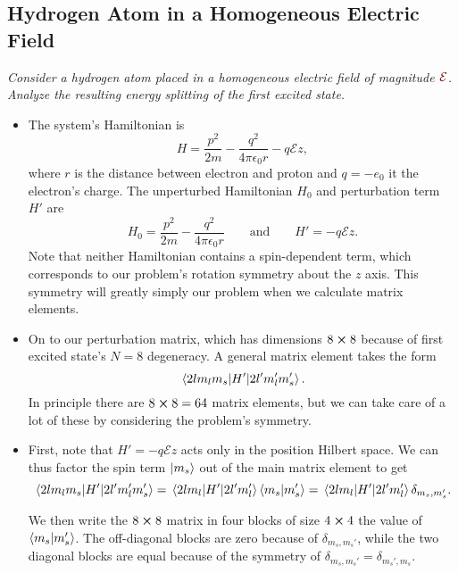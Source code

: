 \documentclass[11pt, a4paper]{article}
\newcommand{\dmath}[1]{\textcolor{Maroon}{#1}}  %
\newcommand{\eqtext}[1]{\qquad \text{#1} \qquad}
\newcommand{\Ham}{Hamiltonian\xspace}
\newcommand{\E}{\mathcal{E}}  %
\begin{document}
\subsection{Hydrogen Atom in a Homogeneous Electric Field}
\textit{Consider a hydrogen atom placed in a homogeneous electric field of magnitude $ \dmath{\E} $. Analyze the resulting energy splitting of the first excited state.}
\begin{itemize}
	\item The system's \Ham is 
	\begin{equation*}
		H = \frac{p^{2}}{2m} - \frac{q^{2}}{4\pi \epsilon_{0} r} - q \E z,
	\end{equation*}
	where $ r $ is the distance between electron and proton and $ q = -e_{0} $ it the electron's charge. The unperturbed Hamiltonian $ H_{0} $ and perturbation term $ H' $ are
	\begin{equation*}
		H_{0} = \frac{p^{2}}{2m} - \frac{q^{2}}{4\pi \epsilon_{0} r} \eqtext{and} H' = - q \E z.
	\end{equation*}
	Note that neither \Ham contains a spin-dependent term, which corresponds to our problem's rotation symmetry about the $ z $ axis. This symmetry will greatly simply our problem when we calculate matrix elements. 

	\item On to our perturbation matrix, which has dimensions $ 8 \cross 8 $ because of first excited state's $ N = 8 $ degeneracy. A general matrix element takes the form
	\begin{equation*}
		\mel{2lm_{l}m_{s}}{H'}{2l'm_{l}'m_{s}'}.
	\end{equation*}
	In principle there are $ 8 \cross 8 = 64 $ matrix elements, but we can take care of a lot of these by considering the problem's symmetry. 
	
	\item First, note that $ H' = - q \E z $ acts only in the position Hilbert space. We can thus factor the spin term $ \ket{m_{s}} $ out of the main matrix element to get
	\begin{equation*}
		\mel{2lm_{l}m_{s}}{H'}{2l'm_{l}'m_{s}'} = \mel{2lm_{l}}{H'}{2l'm_{l}'}\braket{m_{s}}{m_{s}'} = \mel{2lm_{l}}{H'}{2l'm_{l}'} \delta_{m_{s}, m_{s}'}.
	\end{equation*}
	
	We then write the $ 8 \cross 8 $ matrix in four blocks  of size $ 4 \cross 4 $ the value of $ \braket{m_{s}}{m_{s}'} $. The off-diagonal blocks are zero because of $ \delta_{m_{s}, m_{s}'} $, while the two diagonal blocks are equal because of the symmetry of $ \delta_{m_{s}, m_{s}'} = \delta_{m_{s}', m_{s}}$. 
	

\end{itemize}
\end{document}
